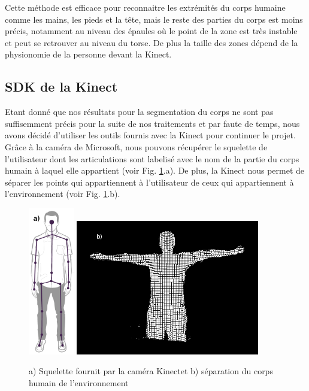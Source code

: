 
Cette méthode est efficace pour reconnaitre les extrémités du corps humaine comme les mains, les pieds et la tête, mais le reste des parties du corps 
est moins précis, notamment au niveau des épaules où le point de la zone est très instable et peut se retrouver au niveau du torse. De plus la taille 
des zones dépend de la physionomie de la personne devant la Kinect. 

\subsection{SDK de la Kinect}
Etant donné que nos résultats pour la segmentation du corps ne sont pas suffisemment précis pour la suite de nos traitements et par faute de
temps, nous avons décidé d'utiliser les outils fournis avec la Kinect pour continuer le projet. Grâce à la caméra de Microsoft, nous pouvons
récupérer le squelette de l'utilisateur dont les articulations sont labelisé avec le nom de la partie du corps humain à laquel elle appartient
(voir Fig. \ref{fig:kinect}.a). De plus, la Kinect nous permet de séparer les points qui appartiennent à l'utilisateur de ceux qui appartiennent
à l'environnement (voir Fig. \ref{fig:kinect}.b).\\

\begin{figure}[!ht]
  \begin{center}
    \includegraphics[width=2cm]{image/kinectSkeleton.png} 
    \includegraphics[width=8cm]{image/seg1.PNG}
    \caption[The LOF caption]{a) Squelette fournit par la caméra Kinect\footnotemark et b) séparation du corps humain de l'environnement}
    \label{fig:kinect}
  \end{center}
\end{figure}

